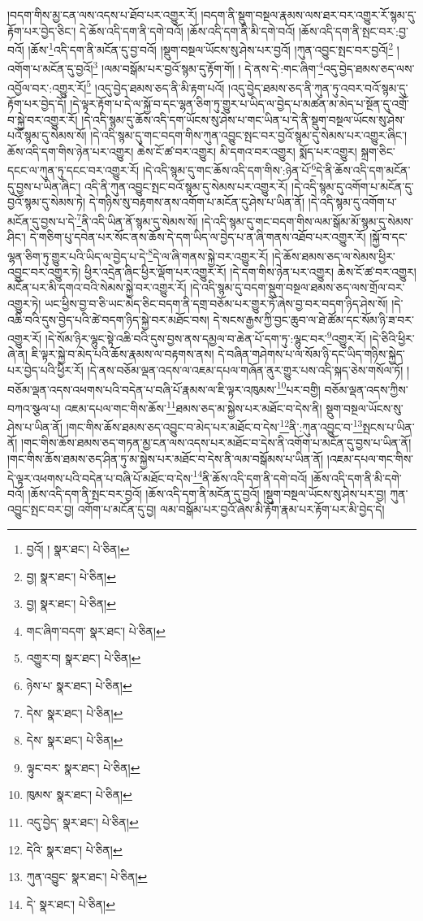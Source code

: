།བདག་གིས་མྱ་ངན་ལས་འདས་པ་ཐོབ་པར་འགྱུར་རོ། །བདག་ནི་སྡུག་བསྔལ་རྣམས་ལས་ཐར་བར་འགྱུར་རོ་སྙམ་དུ་རྟོག་པར་བྱེད་ཅིང་། དེ་ཆོས་འདི་དག་ནི་དགེ་བའོ། །ཆོས་འདི་དག་ནི་མི་དགེ་བའོ། །ཆོས་འདི་དག་ནི་སྤང་བར་:བྱ་བའོ། །ཆོས་\footnote{བྱའོ། །  སྣར་ཐང་།  པེ་ཅིན། }འདི་དག་ནི་མངོན་དུ་བྱ་བའོ། །སྡུག་བསྔལ་ཡོངས་སུ་ཤེས་པར་བྱའོ། །ཀུན་འབྱུང་སྤང་བར་བྱའོ།\footnote{བྱ།  སྣར་ཐང་།  པེ་ཅིན། } །འགོག་པ་མངོན་དུ་བྱའོ།\footnote{བྱ།  སྣར་ཐང་།  པེ་ཅིན། } །ལམ་བསྒོམ་པར་བྱའོ་སྙམ་དུ་རྟོག་གོ། །
དེ་ནས་དེ་:གང་ཞིག་\footnote{གང་ཞིག་བདག་  སྣར་ཐང་།  པེ་ཅིན། }འདུ་བྱེད་ཐམས་ཅད་ལས་འབྱོལ་བར་:འགྱུར་རོ།\footnote{འགྱུར་བ།  སྣར་ཐང་།  པེ་ཅིན། } །འདུ་བྱེད་ཐམས་ཅད་ནི་མི་རྟག་པའོ། །འདུ་བྱེད་ཐམས་ཅད་ནི་ཀུན་ཏུ་འབར་བའོ་སྙམ་དུ་རྟོག་པར་བྱེད་དོ། །དེ་ལྟར་རྟོག་པ་དེ་ལ་སྐྱོ་བ་དང་ལྷན་ཅིག་ཏུ་གྱུར་པ་ཡིད་ལ་བྱེད་པ་མཚན་མ་མེད་པ་སྔོན་དུ་འགྲོ་བ་སྐྱེ་བར་འགྱུར་རོ། །དེ་འདི་སྙམ་དུ་ཆོས་འདི་དག་ཡོངས་སུ་ཤེས་པ་གང་ཡིན་པ་དེ་ནི་སྡུག་བསྔལ་ཡོངས་སུ་ཤེས་པའོ་སྙམ་དུ་སེམས་སོ། །དེ་འདི་སྙམ་དུ་གང་བདག་གིས་ཀུན་འབྱུང་སྤང་བར་བྱའོ་སྙམ་དུ་སེམས་པར་འགྱུར་ཞིང་། ཆོས་འདི་དག་གིས་ཉེན་པར་འགྱུར། ཆེས་ངོ་ཚ་བར་འགྱུར། མི་དགའ་བར་འགྱུར། སྨོད་པར་འགྱུར། སྐྲག་ཅིང་དངང་ལ་ཀུན་ཏུ་དངང་བར་འགྱུར་རོ། །དེ་འདི་སྙམ་དུ་གང་ཆོས་འདི་དག་གིས་:ཉེན་པོ་\footnote{ཉེས་པ་  སྣར་ཐང་།  པེ་ཅིན། }དེ་ནི་ཆོས་འདི་དག་མངོན་དུ་བྱས་པ་ཡིན་ཞིང་། འདི་ནི་ཀུན་འབྱུང་སྤང་བའོ་སྙམ་དུ་སེམས་པར་འགྱུར་རོ། །དེ་འདི་སྙམ་དུ་འགོག་པ་མངོན་དུ་བྱའོ་སྙམ་དུ་སེམས་ཏེ། དེ་གཉིས་སུ་བརྟགས་ནས་འགོག་པ་མངོན་དུ་ཤེས་པ་ཡིན་ནོ། །དེ་འདི་སྙམ་དུ་འགོག་པ་མངོན་དུ་བྱས་པ་དེ་\footnote{དེས་  སྣར་ཐང་།  པེ་ཅིན། }ནི་འདི་ཡིན་ནོ་སྙམ་དུ་སེམས་སོ། །དེ་འདི་སྙམ་དུ་གང་བདག་གིས་ལམ་སྒོམ་མོ་སྙམ་དུ་སེམས་ཤིང་། དེ་གཅིག་པུ་དབེན་པར་སོང་ནས་ཆོས་དེ་དག་ཡིད་ལ་བྱེད་པ་ན་ཞི་གནས་འཐོབ་པར་འགྱུར་རོ། །སྐྱོ་བ་དང་ལྷན་ཅིག་ཏུ་གྱུར་པའི་ཡིད་ལ་བྱེད་པ་དེ་\footnote{དེས་  སྣར་ཐང་།  པེ་ཅིན། }དེ་ལ་ཞི་གནས་སྐྱེ་བར་འགྱུར་རོ། །དེ་ཆོས་ཐམས་ཅད་ལ་སེམས་ཕྱིར་འབྱུང་བར་འགྱུར་ཏེ། ཕྱིར་འདྲེན་ཞིང་ཕྱིར་ལྡོག་པར་འགྱུར་རོ། །དེ་དག་གིས་ཉེན་པར་འགྱུར། ཆེས་ངོ་ཚ་བར་འགྱུར། མངོན་པར་མི་དགའ་བའི་སེམས་སྐྱེ་བར་འགྱུར་རོ། །དེ་འདི་སྙམ་དུ་བདག་སྡུག་བསྔལ་ཐམས་ཅད་ལས་གྲོལ་བར་འགྱུར་ཏེ། ཡང་ཕྱིས་བྱ་བ་ཅི་ཡང་མེད་ཅིང་བདག་ནི་དགྲ་བཅོམ་པར་གྱུར་ཏོ་ཞེས་བྱ་བར་བདག་ཉིད་ཤེས་སོ། །དེ་འཆི་བའི་དུས་བྱེད་པའི་ཚེ་བདག་ཉིད་སྐྱེ་བར་མཐོང་བས། དེ་སངས་རྒྱས་ཀྱི་བྱང་ཆུབ་ལ་ཐེ་ཚོམ་དང་སོམ་ཉི་ཟ་བར་འགྱུར་རོ། །དེ་སོམ་ཉིར་ལྷུང་སྟེ་འཆི་བའི་དུས་བྱས་ནས་དམྱལ་བ་ཆེན་པོ་དག་ཏུ་:ལྷུང་བར་\footnote{ལྟུང་བར་  སྣར་ཐང་།  པེ་ཅིན། }འགྱུར་རོ། །དེ་ཅིའི་ཕྱིར་ཞེ་ན། ཇི་ལྟར་སྐྱེ་བ་མེད་པའི་ཆོས་རྣམས་ལ་བརྟགས་ནས། དེ་བཞིན་གཤེགས་པ་ལ་སོམ་ཉི་དང་ཡིད་གཉིས་སྐྱེད་པར་བྱེད་པའི་ཕྱིར་རོ། །དེ་ནས་བཅོམ་ལྡན་འདས་ལ་འཇམ་དཔལ་གཞོན་ནུར་གྱུར་པས་འདི་སྐད་ཅེས་གསོལ་ཏོ། །བཅོམ་ལྡན་འདས་འཕགས་པའི་བདེན་པ་བཞི་པོ་རྣམས་ལ་ཇི་ལྟར་འཁུམས་\footnote{ཁུམས་  སྣར་ཐང་།  པེ་ཅིན། }པར་བགྱི། བཅོམ་ལྡན་འདས་ཀྱིས་བཀའ་སྩལ་པ། འཇམ་དཔལ་གང་གིས་ཆོས་\footnote{འདུ་བྱེད་  སྣར་ཐང་།  པེ་ཅིན། }ཐམས་ཅད་མ་སྐྱེས་པར་མཐོང་བ་དེས་ནི། སྡུག་བསྔལ་ཡོངས་སུ་ཤེས་པ་ཡིན་ནོ། །གང་གིས་ཆོས་ཐམས་ཅད་འབྱུང་བ་མེད་པར་མཐོང་བ་དེས་\footnote{དེའི་  སྣར་ཐང་།  པེ་ཅིན། }ནི་:ཀུན་འབྱུང་བ་\footnote{ཀུན་འབྱུང་  སྣར་ཐང་།  པེ་ཅིན། }སྤངས་པ་ཡིན་ནོ། །གང་གིས་ཆོས་ཐམས་ཅད་གཏན་མྱ་ངན་ལས་འདས་པར་མཐོང་བ་དེས་ནི་འགོག་པ་མངོན་དུ་བྱས་པ་ཡིན་ནོ། །གང་གིས་ཆོས་ཐམས་ཅད་ཤིན་ཏུ་མ་སྐྱེས་པར་མཐོང་བ་དེས་ནི་ལམ་བསྒོམས་པ་ཡིན་ནོ། །འཇམ་དཔལ་གང་གིས་དེ་ལྟར་འཕགས་པའི་བདེན་པ་བཞི་པོ་མཐོང་བ་དེས་\footnote{དེ་  སྣར་ཐང་།  པེ་ཅིན། }ནི་ཆོས་འདི་དག་ནི་དགེ་བའོ། །ཆོས་འདི་དག་ནི་མི་དགེ་བའོ། །ཆོས་འདི་དག་ནི་སྤང་བར་བྱའོ། །ཆོས་འདི་དག་ནི་མངོན་དུ་བྱའོ། །སྡུག་བསྔལ་ཡོངས་སུ་ཤེས་པར་བྱ། ཀུན་འབྱུང་སྤང་བར་བྱ། འགོག་པ་མངོན་དུ་བྱ། ལམ་བསྒོམ་པར་བྱའོ་ཞེས་མི་རྟོག་རྣམ་པར་རྟོག་པར་མི་བྱེད་དེ། 